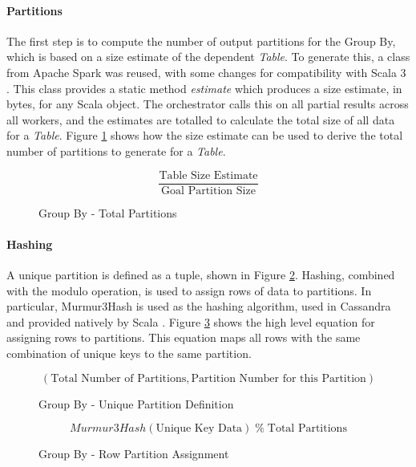 \paragraph{Partitions}
The first step is to compute the number of output partitions for the Group By, which is based on a size estimate of the dependent \textit{Table}. To generate this, a class from Apache Spark was reused, with some changes for compatibility with Scala 3 \cite{zaharia2016spark}. This class provides a static method \textit{estimate} which produces a size estimate, in bytes, for any Scala object. The orchestrator calls this on all partial results across all workers, and the estimates are totalled to calculate the total size of all data for a \textit{Table}. Figure \ref{fig:group-by-num-partitions} shows how the size estimate can be used to derive the total number of partitions to generate for a \textit{Table}.

\begin{figure}[h]
	\centering
	\[ \frac{\text{Table Size Estimate}}{\text{Goal Partition Size}} \]
	\caption{Group By - Total Partitions}
	\label{fig:group-by-num-partitions}
\end{figure}



\paragraph{Hashing} 
A unique partition is defined as a tuple, shown in Figure \ref{fig:group-by-unique-partition}. Hashing, combined with the modulo operation, is used to assign rows of data to partitions. In particular, Murmur3Hash is used as the hashing algorithm, used in Cassandra and provided natively by Scala \cite{murmur3hash}. Figure \ref{fig:group-by-partition-assign} shows the high level equation for assigning rows to partitions. This equation maps all rows with the same combination of unique keys to the same partition.

\begin{figure}[h]
	\centering
	\[ (\text{Total Number of Partitions}, \text{Partition Number for this Partition}) \]
	\caption{Group By - Unique Partition Definition}
	\label{fig:group-by-unique-partition}
\end{figure} 

\begin{figure}[h]
	\centering
	\[ Murmur3Hash(\text{Unique Key Data}) \; \%  \; \text{Total Partitions} \]
	\caption{Group By - Row Partition Assignment}
	\label{fig:group-by-partition-assign}
\end{figure} 

